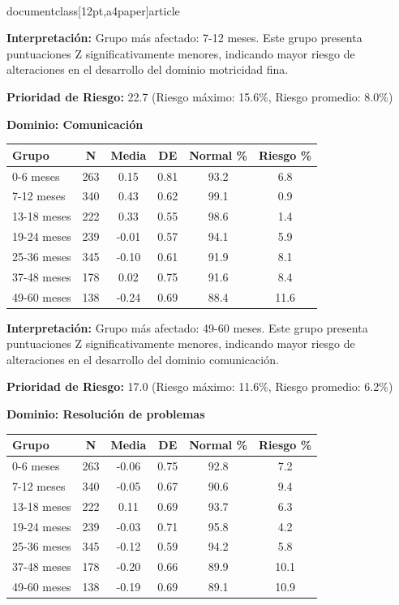 \\documentclass[12pt,a4paper]{article}
\begin{document}
\textbf{Interpretación:} Grupo más afectado: 7-12 meses. Este grupo presenta puntuaciones Z significativamente menores, indicando mayor riesgo de alteraciones en el desarrollo del dominio motricidad fina.

\textbf{Prioridad de Riesgo:} 22.7 (Riesgo máximo: 15.6\%, Riesgo promedio: 8.0\%)


\vspace{0.5cm}


\textbf{Dominio: Comunicación}


\begin{center}
\begin{tabular}{|l|c|c|c|c|c|}
\hline
\textbf{Grupo} & \textbf{N} & \textbf{Media} & \textbf{DE} & \textbf{Normal \%} & \textbf{Riesgo \%} \\
\hline
0-6 meses & 263 & 0.15 & 0.81 & 93.2 & 6.8 \\
7-12 meses & 340 & 0.43 & 0.62 & 99.1 & 0.9 \\
13-18 meses & 222 & 0.33 & 0.55 & 98.6 & 1.4 \\
19-24 meses & 239 & -0.01 & 0.57 & 94.1 & 5.9 \\
25-36 meses & 345 & -0.10 & 0.61 & 91.9 & 8.1 \\
37-48 meses & 178 & 0.02 & 0.75 & 91.6 & 8.4 \\
49-60 meses & 138 & -0.24 & 0.69 & 88.4 & 11.6 \\

\hline
\end{tabular}
\end{center}


\textbf{Interpretación:} Grupo más afectado: 49-60 meses. Este grupo presenta puntuaciones Z significativamente menores, indicando mayor riesgo de alteraciones en el desarrollo del dominio comunicación.

\textbf{Prioridad de Riesgo:} 17.0 (Riesgo máximo: 11.6\%, Riesgo promedio: 6.2\%)


\vspace{0.5cm}


\textbf{Dominio: Resolución de problemas}


\begin{center}
\begin{tabular}{|l|c|c|c|c|c|}
\hline
\textbf{Grupo} & \textbf{N} & \textbf{Media} & \textbf{DE} & \textbf{Normal \%} & \textbf{Riesgo \%} \\
\hline
0-6 meses & 263 & -0.06 & 0.75 & 92.8 & 7.2 \\
7-12 meses & 340 & -0.05 & 0.67 & 90.6 & 9.4 \\
13-18 meses & 222 & 0.11 & 0.69 & 93.7 & 6.3 \\
19-24 meses & 239 & -0.03 & 0.71 & 95.8 & 4.2 \\
25-36 meses & 345 & -0.12 & 0.59 & 94.2 & 5.8 \\
37-48 meses & 178 & -0.20 & 0.66 & 89.9 & 10.1 \\
49-60 meses & 138 & -0.19 & 0.69 & 89.1 & 10.9 \\

\hline
\end{tabular}
\end{center}
\end{document}
